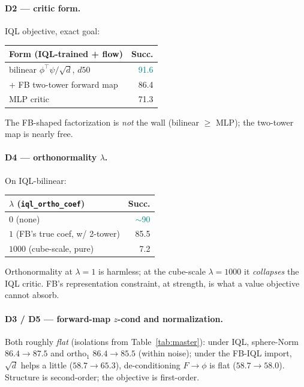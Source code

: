 \documentclass[11pt]{article}
\newcommand{\good}[1]{\textcolor{teal}{#1}}
\newcommand{\bad}[1]{\textcolor{red!70!black}{#1}}
\begin{document}
\paragraph{D2 --- critic form.}
IQL objective, exact goal:
\begin{center}\small
\begin{tabular}{@{}l r@{}}
\toprule
Form (IQL-trained + flow) & Succ. \\
\midrule
bilinear $\phi^\top\psi/\sqrt d$, $d50$ & \good{91.6} \\
\;+ FB two-tower forward map & 86.4 \\
MLP critic & 71.3 \\
\bottomrule
\end{tabular}
\end{center}
The FB-shaped factorization is \emph{not} the wall (bilinear $\ge$ MLP); the
two-tower map is nearly free.

\paragraph{D4 --- orthonormality $\lambda$.} On IQL-bilinear:
\begin{center}\small
\begin{tabular}{@{}l r@{}}
\toprule
$\lambda$ (\texttt{iql\_ortho\_coef}) & Succ. \\
\midrule
$0$ (none)                     & \good{$\sim$90} \\
$1$ (FB's true coef, w/ 2-tower) & 85.5 \\
$1000$ (cube-scale, pure)      & \bad{7.2} \\
\bottomrule
\end{tabular}
\end{center}
Orthonormality at $\lambda{=}1$ is harmless; at the cube-scale $\lambda{=}1000$ it
\emph{collapses} the IQL critic. FB's representation constraint, at strength, is
what a value objective cannot absorb.

\paragraph{D3 / D5 --- forward-map $z$-cond and normalization.} Both roughly
\emph{flat} (isolations from Table~\ref{tab:master}): under IQL, sphere-Norm
$86.4{\to}87.5$ and ortho$_1$ $86.4{\to}85.5$ (within noise); under the FB-IQL
import, $\sqrt d$ helps a little ($58.7{\to}65.3$), de-conditioning $F{\to}\phi$ is
flat ($58.7{\to}58.0$). Structure is second-order; the objective is first-order.
\end{document}
